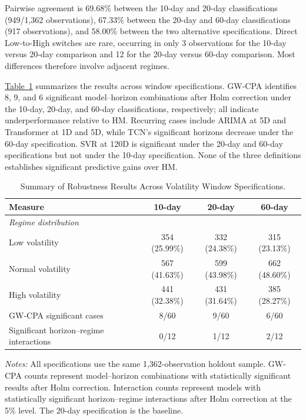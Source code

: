 \documentclass[runningheads,orivec]{llncs}
\begin{document}
Pairwise agreement is 69.68\% between the 10-day and 20-day classifications (949/1,362 observations), 67.33\% between the 20-day and 60-day classifications (917 observations), and 58.00\% between the two alternative specifications. Direct Low-to-High switches are rare, occurring in only 3 observations for the 10-day versus 20-day comparison and 12 for the 20-day versus 60-day comparison. Most differences therefore involve adjacent regimes.

\hyperref[tab:volatility_window_robustness]{Table~\ref*{tab:volatility_window_robustness}} summarizes the results across window specifications. GW-CPA identifies 8, 9, and 6 significant model--horizon combinations after Holm correction under the 10-day, 20-day, and 60-day classifications, respectively; all indicate underperformance relative to HM. Recurring cases include ARIMA at 5D and Transformer at 1D and 5D, while TCN's significant horizons decrease under the 60-day specification. SVR at 120D is significant under the 20-day and 60-day specifications but not under the 10-day specification. None of the three definitions establishes significant predictive gains over HM.

\begin{table}[htbp]
\centering
\caption{Summary of Robustness Results Across Volatility Window Specifications.}\label{tab:volatility_window_robustness}
\setlength{\tabcolsep}{6pt}
\begin{tabular}{lccc}
\hline
\textbf{Measure} & \textbf{10-day} & \textbf{20-day} & \textbf{60-day} \\
\hline
\multicolumn{4}{l}{\textit{Regime distribution}} \\
Low volatility & 354 (25.99\%) & 332 (24.38\%) & 315 (23.13\%) \\
Normal volatility & 567 (41.63\%) & 599 (43.98\%) & 662 (48.60\%) \\
High volatility & 441 (32.38\%) & 431 (31.64\%) & 385 (28.27\%) \\
\hline
GW-CPA significant cases & 8/60 & 9/60 & 6/60 \\
Significant horizon--regime interactions & 0/12 & 1/12 & 2/12 \\
\hline
\end{tabular}
\par\vspace{4pt}\parbox{\linewidth}{\scriptsize\textit{Notes:} All specifications use the same 1,362-observation holdout sample. GW-CPA counts represent model--horizon combinations with statistically significant results after Holm correction. Interaction counts represent models with statistically significant horizon--regime interactions after Holm correction at the 5\% level. The 20-day specification is the baseline.}
\end{table}
\end{document}
